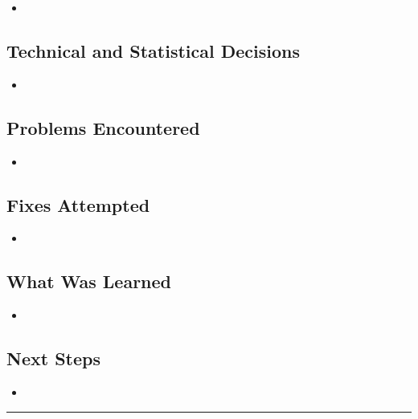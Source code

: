 \documentclass[11pt,a4paper]{article}
\newcommand{\entryseparator}{
  \vspace{1em} \noindent\rule{\textwidth}{0.4pt}
  \vspace*{-\baselineskip} 
}
\begin{document}
\begin{itemize}
    \item
\end{itemize}

\subsection{Technical and Statistical Decisions}

\begin{itemize}
    \item

\end{itemize}

\subsection{Problems Encountered}

\begin{itemize}
    \item 
\end{itemize}

\subsection{Fixes Attempted}

\begin{itemize}
    \item
\end{itemize}

\subsection{What Was Learned}

\begin{itemize}
    \item 
\end{itemize}

\subsection{Next Steps}

\begin{itemize}
    \item 
\end{itemize}
\entryseparator
\end{document}
